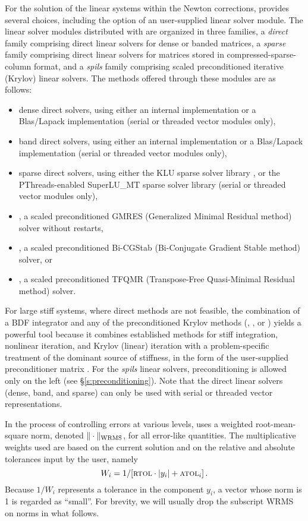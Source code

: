 For the solution of the linear systems within the Newton corrections, 
{\idas} provides several choices, including the option of an user-supplied
linear solver module. The linear solver modules distributed with {\sundials}
are organized in three families, a {\em direct} family comprising direct linear 
solvers for dense or banded matrices, a {\em sparse} family comprising
direct linear solvers for matrices stored in compressed-sparse-column
format, and a {\em spils} family comprising scaled preconditioned
iterative (Krylov) linear solvers. 
The methods offered through these modules are as follows:
\begin{itemize}
\item dense direct solvers, using either an internal implementation or 
  a Blas/Lapack implementation (serial or threaded vector modules only),
\item band direct solvers, using either an internal implementation or 
  a Blas/Lapack implementation (serial or threaded vector modules only),
\item sparse direct solvers, using either the KLU sparse solver
  library \cite{KLU_site}, or the PThreads-enabled SuperLU\_MT sparse
  solver library \cite{SuperLUMT_site} (serial or threaded vector modules only),
\item {\spgmr}, a scaled preconditioned GMRES (Generalized Minimal Residual method)
  solver without restarts,
\item {\spbcg}, a scaled preconditioned Bi-CGStab (Bi-Conjugate Gradient Stable
  method) solver, or
\item {\sptfqmr}, a scaled preconditioned TFQMR (Transpose-Free Quasi-Minimal
  Residual method) solver.
\end{itemize}
For large stiff systems, where direct methods are not feasible, the
combination of a BDF integrator and any of the preconditioned Krylov
methods ({\spgmr}, {\spbcg}, or {\sptfqmr}) yields a powerful tool
because it combines established methods for stiff integration,
nonlinear iteration, and Krylov (linear) iteration with a
problem-specific treatment of the dominant source of stiffness, in the
form of the user-supplied preconditioner matrix \cite{BrHi:89}. 
For the {\em spils} linear solvers,  preconditioning is allowed
only on the left (see \S\ref{s:preconditioning}).
Note that the direct linear solvers (dense, band, and sparse) can only be 
used with serial or threaded vector representations.

In the process of controlling errors at various levels, {\idas} uses a
weighted root-mean-square norm, denoted $\|\cdot\|_{\mbox{\scriptsize WRMS}}$,
for all error-like quantities.  The multiplicative weights used are based on
the current solution and on the relative and absolute tolerances input by the
user, namely
\begin{equation}\label{e:errwt}
 W_i = 1 / [ \mbox{\sc rtol} \cdot |y_i| + \mbox{\sc atol}_i ] \, .
\end{equation}
Because $1/W_i$ represents a tolerance in the component $y_i$, a vector
whose norm is 1 is regarded as ``small''.  For brevity, we will
usually drop the subscript WRMS on norms in what follows.

